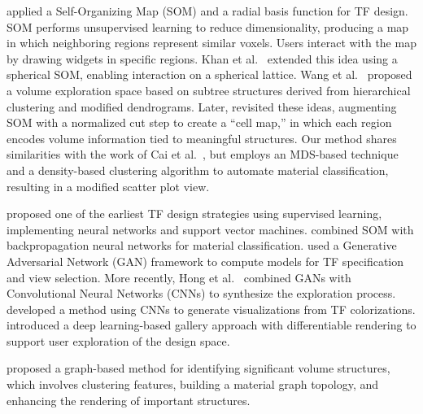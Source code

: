 \cite{moura2007} applied a Self-Organizing Map (SOM) and a radial basis function for TF design. SOM performs unsupervised learning to reduce dimensionality, producing a map in which neighboring regions represent similar voxels. Users interact with the map by drawing widgets in specific regions. Khan et al.~\cite{khan2015} extended this idea using a spherical SOM, enabling interaction on a spherical lattice. Wang et al.~\cite{wang2011} proposed a volume exploration space based on subtree structures derived from hierarchical clustering and modified dendrograms. Later, \cite{cai2017} revisited these ideas, augmenting SOM with a normalized cut step to create a ``cell map,'' in which each region encodes volume information tied to meaningful structures. Our method shares similarities with the work of Cai et al.~\cite{cai2017}, but employs an MDS-based technique and a density-based clustering algorithm to automate material classification, resulting in a modified scatter plot view.

\cite{tzeng2005} proposed one of the earliest TF design strategies using supervised learning, implementing neural networks and support vector machines. \cite{wang2006} combined SOM with backpropagation neural networks for material classification. \cite{berger2018} used a Generative Adversarial Network (GAN) framework to compute models for TF specification and view selection. More recently, Hong et al.~\cite{hong2019} combined GANs with Convolutional Neural Networks (CNNs) to synthesize the exploration process. \cite{kim2021} developed a method using CNNs to generate visualizations from TF colorizations. \cite{pan2024} introduced a deep learning-based gallery approach with differentiable rendering to support user exploration of the design space.

\cite{sharma2020} proposed a graph-based method for identifying significant volume structures, which involves clustering features, building a material graph topology, and enhancing the rendering of important structures.
